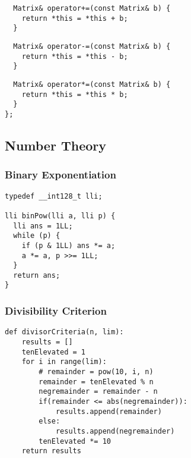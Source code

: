 \documentclass[twoside]{article}
\begin{document}
\begin{multicols*}{2}
\begin{verbatim}
  Matrix& operator+=(const Matrix& b) {
    return *this = *this + b;
  }
\end{verbatim}
\vspace{-12pt}
\begin{verbatim}
  Matrix& operator-=(const Matrix& b) {
    return *this = *this - b;
  }
\end{verbatim}
\vspace{-12pt}
\begin{verbatim}
  Matrix& operator*=(const Matrix& b) {
    return *this = *this * b;
  }
};
\end{verbatim}

\subsectionfont{\bfseries\sffamily\centering\LARGE}
\vspace{0em}
\subsection*{Number Theory}
\vspace{2em}
\subsubsectionfont{\large\bfseries\sffamily\underline}
\subsubsection*{Binary Exponentiation}
\begin{verbatim}
typedef __int128_t lli;

lli binPow(lli a, lli p) {
  lli ans = 1LL;
  while (p) {
    if (p & 1LL) ans *= a;
    a *= a, p >>= 1LL;
  }
  return ans;
}
\end{verbatim}

\subsubsectionfont{\large\bfseries\sffamily\underline}
\subsubsection*{Divisibility Criterion}
\begin{verbatim}
def divisorCriteria(n, lim):
    results = []
    tenElevated = 1
    for i in range(lim):
        # remainder = pow(10, i, n)
        remainder = tenElevated % n
        negremainder = remainder - n
        if(remainder <= abs(negremainder)):
            results.append(remainder)
        else:
            results.append(negremainder)
        tenElevated *= 10
    return results



\end{verbatim}
\end{multicols*}
\end{document}
